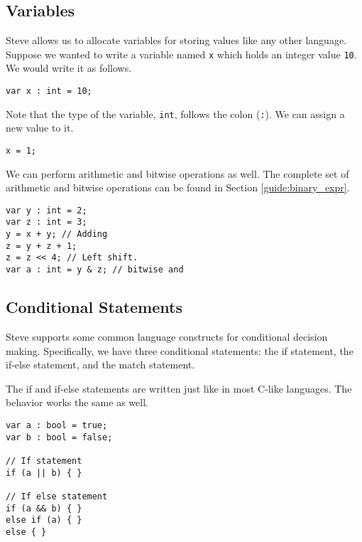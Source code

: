\subsection{Variables} \label{tut:variable}

Steve allows us to allocate variables for storing values like any other language. Suppose we wanted to write a variable named \texttt{x} which holds an integer value \texttt{10}. We would write it as follows.

\begin{codepage}
\begin{lstlisting}
var x : int = 10;
\end{lstlisting}
\end{codepage}

Note that the type of the variable, \texttt{int}, follows the colon (\texttt{:}). We can assign a new value to it.

\begin{codepage}
\begin{lstlisting}
x = 1;
\end{lstlisting}
\end{codepage}

We can perform arithmetic and bitwise operations as well. The complete set of arithmetic and bitwise operations can be found in Section \ref{guide:binary_expr}.

\begin{codepage}
\begin{lstlisting}
var y : int = 2;
var z : int = 3;
y = x + y; // Adding
z = y + z + 1; 
z = z << 4; // Left shift.
var a : int = y & z; // bitwise and
\end{lstlisting}
\end{codepage}


\subsection{Conditional Statements} \label{tut:condition}

Steve supports some common language constructs for conditional decision making. Specifically, we have three conditional statements: the if statement, the if-else statement, and the match statement.

The if and if-else statements are written just like in most C-like languages. The behavior works the same as well.

\begin{codepage}
\begin{lstlisting}
var a : bool = true;
var b : bool = false;

// If statement
if (a || b) { }

// If else statement
if (a && b) { }
else if (a) { }
else { }
\end{lstlisting}
\end{codepage}

